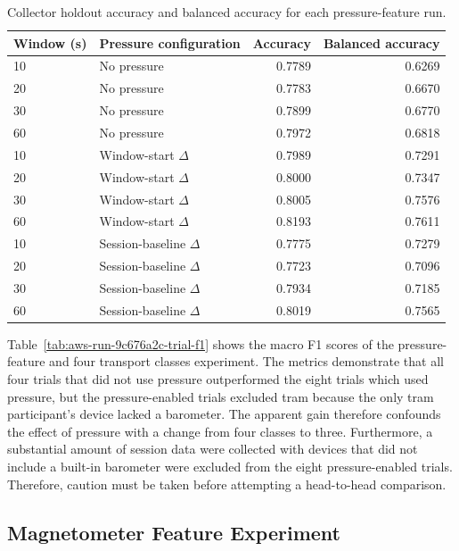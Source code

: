 \begin{table}[htbp]
\centering
\caption{Collector holdout accuracy and balanced accuracy for each pressure-feature run.}
\label{tab:aws-run-9c676a2c-trial-accuracy}
\small
\begin{tabular}{llrr}
\hline
\textbf{Window (s)} & \textbf{Pressure configuration} & \textbf{Accuracy} & \textbf{Balanced accuracy} \\
\hline
10 & No pressure & 0.7789 & 0.6269 \\
20 & No pressure & 0.7783 & 0.6670 \\
30 & No pressure & 0.7899 & 0.6770 \\
60 & No pressure & 0.7972 & 0.6818 \\
10 & Window-start $\Delta$ & 0.7989 & 0.7291 \\
20 & Window-start $\Delta$ & 0.8000 & 0.7347 \\
30 & Window-start $\Delta$ & 0.8005 & 0.7576 \\
60 & Window-start $\Delta$ & 0.8193 & 0.7611 \\
10 & Session-baseline $\Delta$ & 0.7775 & 0.7279 \\
20 & Session-baseline $\Delta$ & 0.7723 & 0.7096 \\
30 & Session-baseline $\Delta$ & 0.7934 & 0.7185 \\
60 & Session-baseline $\Delta$ & 0.8019 & 0.7565 \\
\hline
\end{tabular}
\end{table}

Table~\ref{tab:aws-run-9c676a2c-trial-f1} shows the macro F1 scores of the pressure-feature and four transport classes experiment. The metrics demonstrate that all four trials that did not use pressure outperformed the eight trials which used pressure, but the pressure-enabled trials excluded tram because the only tram participant's device lacked a barometer. The apparent gain therefore confounds the effect of pressure with a change from four classes to three. Furthermore, a substantial amount of session data were collected with devices that did not include a built-in barometer were excluded from the eight pressure-enabled trials. Therefore, caution must be taken before attempting a head-to-head comparison.

\subsection{Magnetometer Feature Experiment}

